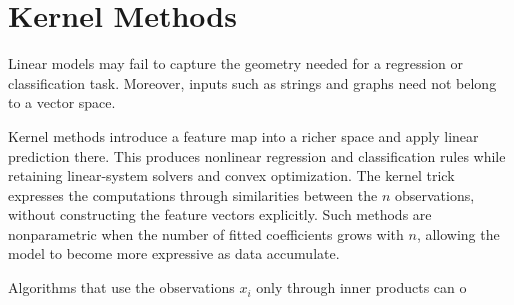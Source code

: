                                                   
\section{Kernel Methods}
\label{sec-kernel-methods}

Linear models may fail to capture the geometry needed for a regression or classification task. Moreover, inputs such as strings and graphs need not belong to a vector space.

Kernel methods introduce a feature map into a richer space and apply linear prediction there. This produces nonlinear regression and classification rules while retaining linear-system solvers and convex optimization. The kernel trick expresses the computations through similarities between the $n$ observations, without constructing the feature vectors explicitly. Such methods are nonparametric when the number of fitted coefficients grows with $n$, allowing the model to become more expressive as data accumulate.

Algorithms that use the observations $x_i$ only through inner products can o